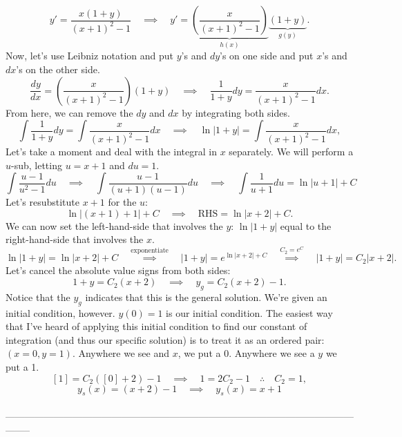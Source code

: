 \documentclass[a4paper,12pt]{article} %
\begin{document}
$$ y' = \frac{x(1+y)}{(x+1)^2 - 1} \quad\implies\quad y' = \underbrace{\left(\frac{x}{(x+1)^2-1}\right)}_{h(x)}\underbrace{\left(1+y\right)}_{g(y)}.
$$
Now, let's use Leibniz notation and put $y$'s and $dy$'s on one side and put $x$'s and $dx$'s on the other side.
$$ \frac{dy}{dx} = \left(\frac{x}{(x+1)^2-1}\right){\left(1+y\right)} \quad\implies\quad \frac{1}{1 + y}dy = \frac{x}{(x+1)^2-1}dx. $$
From here, we can remove the $dy$ and $dx$ by integrating both sides.
$$ \int \frac{1}{1 + y}dy = \int \frac{x}{(x+1)^2-1}dx \quad\implies\quad \ln{|1 + y|} = \int \frac{x}{(x+1)^2-1}dx, $$
Let's take a moment and deal with the integral in $x$ separately. We will perform a $u$-sub, letting $u=x+1$ and $du = 1$.
$$ \int \frac{u - 1}{u^2 - 1}du \quad\implies\quad \int \frac{u-1}{(u+1)(u-1)}du \quad\implies\quad  \int \frac{1}{u+1}du = \ln{|u+1|} + C $$
Let's resubstitute $x+1$ for the $u$:
$$ \ln{|(x + 1) + 1|} + C \quad\implies\quad \text{RHS} = \ln{|x + 2|} + C. $$
We can now set the left-hand-side that involves the $y$: $\ln{|1 + y|}$ equal to the right-hand-side that involves the $x$.
$$ \ln{|1 + y|} = \ln{|x + 2|} + C \quad\overset{\text{exponentiate}}\implies\quad |1 + y| = e^{\ln{|x+2|} + C} \quad\overset{C_2=e^{C}}\implies\quad |1+y| = C_2|x+2|.$$
Let's cancel the absolute value signs from both sides:
$$ 1 + y = C_2(x + 2) \quad\implies\quad y_g = C_2(x + 2) - 1. $$
Notice that the $y_g$ indicates that this is the general solution. We're given an initial condition, however. $y(0)=1$ is our initial condition. The easiest way that I've heard of applying this initial condition to find our constant of integration (and thus our specific solution) is to treat it as an ordered pair: $(x=0, y=1)$. Anywhere we see and $x$, we put a 0. Anywhere we see a $y$ we put a 1.\\

$$[1] = C_2([0] + 2) - 1 \quad\implies\quad 1 = 2C_2 - 1 \quad\therefore\quad C_2 = 1,$$
$$ y_s(x) = (x + 2)-1 \quad\implies\quad \boxed{y_s(x) = x + 1} $$
\\
--------------------------------------------------------------------------------------------------------------------

\pagebreak
\end{document}
